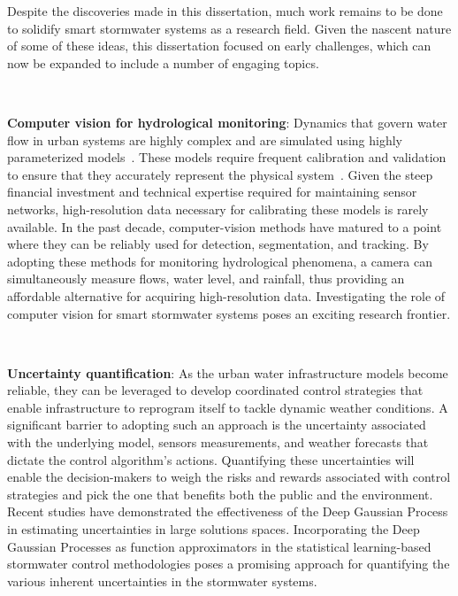 Despite the discoveries made in this dissertation, much work remains to be done to solidify smart stormwater systems as a research field.
Given the nascent nature of some of these ideas, this dissertation focused on early challenges, which can now be expanded to include a number of engaging topics.

\

\textbf{Computer vision for hydrological monitoring}: Dynamics that govern water flow in urban systems are highly complex and are simulated using highly parameterized models~\cite{Rossman2010Storm5.1}.
These models require frequent calibration and validation to ensure that they accurately represent the physical system~\cite{Rossman2010Storm5.1, national2009urban}.
Given the steep financial investment and technical expertise required for maintaining sensor networks, high-resolution data necessary for calibrating these models is rarely available\cite{kerkez2016, Bartos_2018}.
In the past decade, computer-vision methods have matured to a point where they can be reliably used for detection, segmentation, and tracking\cite{LeCun2015DeepLearning}.
By adopting these methods for monitoring hydrological phenomena, a camera can simultaneously measure flows, water level, and rainfall, thus providing an affordable alternative for acquiring high-resolution data.
Investigating the role of computer vision for smart stormwater systems poses an exciting research frontier.

\

\textbf{Uncertainty quantification}: As the urban water infrastructure models become reliable, they can be leveraged to develop coordinated control strategies that enable infrastructure to reprogram itself to tackle dynamic weather conditions\cite{Mullapudi_Lewis_Gruden_Kerkez_2020}.
A significant barrier to adopting such an approach is the uncertainty associated with the underlying model, sensors measurements, and weather forecasts that dictate the control algorithm's actions.
Quantifying these uncertainties will enable the decision-makers to weigh the risks and rewards associated with control strategies and pick the one that benefits both the public and the environment\cite{sadler2019}.
Recent studies have demonstrated the effectiveness of the Deep Gaussian Process in estimating uncertainties in large solutions spaces\cite{damianou2013deep}.
Incorporating the Deep Gaussian Processes as function approximators in the statistical learning-based stormwater control methodologies poses a promising approach for quantifying the various inherent uncertainties in the stormwater systems.

